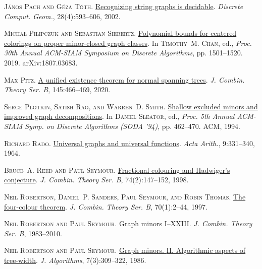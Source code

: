\documentclass[a4paper,11pt]{article}
\theoremstyle{plain}
\theoremstyle{definition}
\begin{document}
\textsc{J{\'a}nos Pach and G{\'e}za T{\'o}th}.
\newblock \href{https://doi.org/10.1007/s00454-002-2891-4}{Recognizing string
  graphs is decidable}.
\newblock \emph{Discrete Comput. Geom.}, 28(4):593--606, 2002.

\textsc{Micha{\l} Pilipczuk and Sebastian Siebertz}.
\newblock \href{https://doi.org/10.1137/1.9781611975482.91}{Polynomial bounds
  for centered colorings on proper minor-closed graph classes}.
\newblock In \textsc{Timothy~M. Chan}, ed., \emph{Proc. 30th {A}nnual
  {ACM}-{SIAM} {S}ymposium on {D}iscrete {A}lgorithms}, pp. 1501--1520. 2019.
\newblock arXiv:1807.03683.

\textsc{Max Pitz}.
\newblock \href{https://doi.org/10.1016/j.jctb.2020.07.002}{A unified existence
  theorem for normal spanning trees}.
\newblock \emph{J. Combin. Theory Ser. B}, 145:466--469, 2020.

\textsc{Serge Plotkin, Satish Rao, and Warren~D. Smith}.
\newblock \href{http://dl.acm.org/citation.cfm?id=314464.314625}{Shallow
  excluded minors and improved graph decompositions}.
\newblock In \textsc{Daniel Sleator}, ed., \emph{Proc. 5th Annual ACM-SIAM
  Symp. on Discrete Algorithms (SODA '94)}, pp. 462--470. ACM, 1994.

\textsc{Richard Rado}.
\newblock \href{https://doi.org/10.4064/aa-9-4-331-340}{Universal graphs and
  universal functions}.
\newblock \emph{Acta Arith.}, 9:331--340, 1964.

\textsc{Bruce~A. Reed and Paul Seymour}.
\newblock \href{https://doi.org/10.1006/jctb.1998.1835}{Fractional colouring
  and {H}adwiger's conjecture}.
\newblock \emph{J. Combin. Theory Ser. B}, 74(2):147--152, 1998.

\textsc{Neil Robertson, Daniel~P. Sanders, Paul Seymour, and Robin Thomas}.
\newblock \href{https://doi.org/10.1006/jctb.1997.1750}{The four-colour
  theorem}.
\newblock \emph{J. Combin. Theory Ser. B}, 70(1):2--44, 1997.

\textsc{Neil Robertson and Paul Seymour}.
\newblock Graph minors {I--XXIII}.
\newblock \emph{J. Combin. Theory Ser. B}, 1983--2010.

\textsc{Neil Robertson and Paul Seymour}.
\newblock \href{https://doi.org/10.1016/0196-6774(86)90023-4}{Graph minors.
  {II}. {A}lgorithmic aspects of tree-width}.
\newblock \emph{J. Algorithms}, 7(3):309--322, 1986{}.
\end{document}
